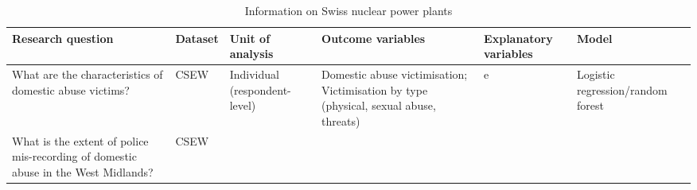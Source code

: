 \documentclass[11pt, a4paper]{article}
\begin{document}
\begin{table}[!htbp]
\caption{Information on Swiss nuclear power plants}
  \begin{threeparttable}[t]
  \centering
       \begin{tabular}{ L{2.8cm}  C{1.8cm}  C{1.8cm}  C{3.2cm}  C{2.8cm}  C{2cm} }
    \toprule
     \textbf{Research question} & \textbf{Dataset}    & \textbf{Unit of analysis} & \textbf{Outcome variables} & \textbf{Explanatory variables} & \textbf{Model} \\
    \midrule
    What are the characteristics of domestic abuse victims? & CSEW & Individual (respondent-level) & Domestic abuse victimisation; Victimisation by type (physical, sexual abuse, threats) & e & Logistic regression/random forest \\
    What is the extent of police mis-recording of domestic abuse in the West Midlands? & CSEW & & & & \\
     \bottomrule
  \end{tabular}
    \end{threeparttable}%
  \label{tab:addlabel}%
\end{table}%

\end{document}
